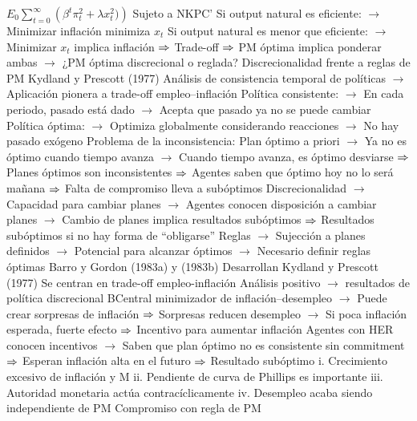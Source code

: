 \documentclass{nuevotema}
\begin{document}
\begin{esquemal}
				\4[] $E_0 \sum_{t=0}^\infty \left( \beta^t \pi_t^2 + \lambda x_t^2) \right)$
				\4[] Sujeto a NKPC'
				\4[] Si output natural es eficiente:
				\4[] $\to$ Minimizar inflación minimiza $x_t$
				\4[] Si output natural es menor que eficiente:
				\4[] $\to$ Minimizar $x_t$ implica inflación
				\4[] $\Rightarrow$ Trade-off
				\4[] $\Rightarrow$ PM óptima implica ponderar ambas
				\4[] $\to$ ¿PM óptima discrecional o reglada?
			\3 Discrecionalidad frente a reglas de PM
				\4 Kydland y Prescott (1977)
				\4[] Análisis de consistencia temporal de políticas
				\4[] $\to$ Aplicación pionera a trade-off empleo--inflación
				\4[] Política consistente:
				\4[] $\to$ En cada periodo, pasado está dado
				\4[] $\to$ Acepta que pasado ya no se puede cambiar
				\4[] Política óptima:
				\4[] $\to$ Optimiza globalmente considerando reacciones
				\4[] $\to$ No hay pasado exógeno
				\4[] Problema de la inconsistencia:
				\4[] Plan óptimo a priori
				\4[] $\to$ Ya no es óptimo cuando tiempo avanza
				\4[] $\to$ Cuando tiempo avanza, es óptimo desviarse
				\4[] $\Rightarrow$ Planes óptimos son inconsistentes
				\4[] $\Rightarrow$ Agentes saben que óptimo hoy no lo será mañana
				\4[] $\Rightarrow$ Falta de compromiso lleva a subóptimos
				\4[] Discrecionalidad
				\4[] $\to$ Capacidad para cambiar planes
				\4[] $\to$ Agentes conocen disposición a cambiar planes
				\4[] $\to$ Cambio de planes implica resultados subóptimos
				\4[] $\Rightarrow$ Resultados subóptimos si no hay forma de ``obligarse''
				\4[] Reglas
				\4[] $\to$ Sujección a planes definidos
				\4[] $\to$ Potencial para alcanzar óptimos
				\4[] $\to$ Necesario definir reglas óptimas
				\4[] 
				\4 Barro y Gordon (1983a) y (1983b)
				\4[] Desarrollan Kydland y Prescott (1977)
				\4[] Se centran en trade-off empleo-inflación
				\4[] Análisis positivo
				\4[] $\to$ resultados de política discrecional
				\4[] BCentral minimizador de inflación--desempleo
				\4[] $\to$ Puede crear sorpresas de inflación
				\4[] $\Rightarrow$ Sorpresas reducen desempleo
				\4[] $\to$ Si poca inflación esperada, fuerte efecto
				\4[] $\Rightarrow$ Incentivo para aumentar inflación
				\4[] Agentes con HER conocen incentivos
				\4[] $\to$ Saben que plan óptimo no es consistente sin commitment
				\4[] $\Rightarrow$ Esperan inflación alta en el futuro
				\4[] $\Rightarrow$ Resultado subóptimo
				\4[] i. Crecimiento excesivo de inflación y M
				\4[] ii. Pendiente de curva de Phillips es importante
				\4[] iii. Autoridad monetaria actúa contracíclicamente
				\4[] iv. Desempleo acaba siendo independiente de PM
				\4[] Compromiso con regla de PM

\end{esquemal}
\end{document}
